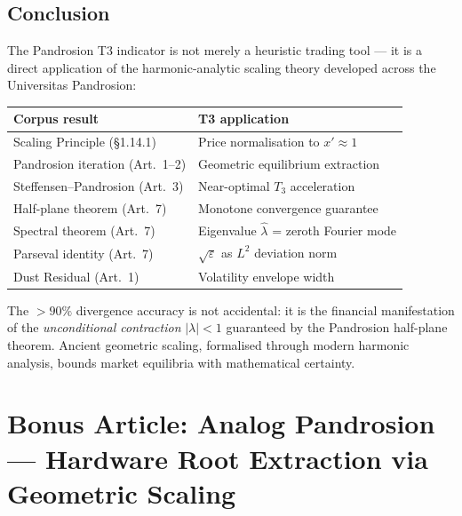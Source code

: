\documentclass[10pt,a4paper,oneside]{book}
\theoremstyle{definition}
\theoremstyle{remark}
\begin{document}
\section{Conclusion}

The Pandrosion T3 indicator is not merely a heuristic trading tool --- it is a direct application of the harmonic-analytic scaling theory developed across the Universitas Pandrosion:

\begin{center}
\renewcommand{\arraystretch}{1.3}
\begin{tabular}{ll}
\toprule
\textbf{Corpus result} & \textbf{T3 application} \\
\midrule
Scaling Principle (\S1.14.1) & Price normalisation to $x' \approx 1$ \\
Pandrosion iteration (Art.~1--2) & Geometric equilibrium extraction \\
Steffensen--Pandrosion (Art.~3) & Near-optimal $T_3$ acceleration \\
Half-plane theorem (Art.~7) & Monotone convergence guarantee \\
Spectral theorem (Art.~7) & Eigenvalue $\hat{\lambda}$ = zeroth Fourier mode \\
Parseval identity (Art.~7) & $\sqrt{\varepsilon}$ as $L^2$ deviation norm \\
Dust Residual (Art.~1) & Volatility envelope width \\
\bottomrule
\end{tabular}
\end{center}

The $> 90\%$ divergence accuracy is not accidental: it is the financial manifestation of the \emph{unconditional contraction} $|\lambda| < 1$ guaranteed by the Pandrosion half-plane theorem.  Ancient geometric scaling, formalised through modern harmonic analysis, bounds market equilibria with mathematical certainty.



\chapter{Bonus Article: Analog Pandrosion --- Hardware Root Extraction via Geometric Scaling}
\end{document}
